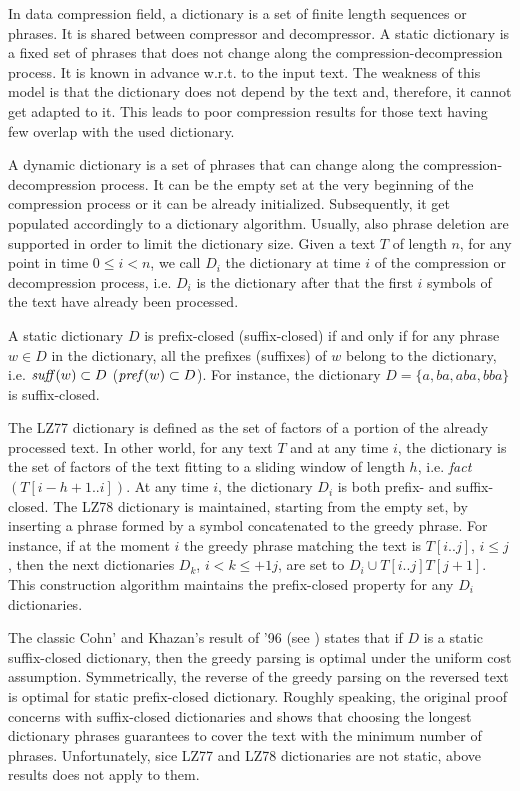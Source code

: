 \documentclass[12pt]{article}
\theoremstyle{plain}
\theoremstyle{definition}
\theoremstyle{remark}
\begin{document}
In data compression field, a dictionary is a set of finite length sequences or phrases. It is shared between compressor and decompressor. A static dictionary is a fixed set of phrases that does not change along the compression-decompression process. It is known in advance w.r.t. to the input text. The weakness of this model is that the dictionary does not depend by the text and, therefore, it cannot get adapted to it. This leads to poor compression results for those text having few overlap with the used dictionary.

A dynamic dictionary is a set of phrases that can change along the compression-decompression process. It can be the empty set at the very beginning of the compression process or it can be already initialized. Subsequently, it get populated accordingly to a dictionary algorithm. Usually, also phrase deletion are supported in order to limit the dictionary size. Given a text $T$ of length $n$, for any point in time $0 \leq i < n$, we call $D_i$ the dictionary 
at time $i$ of the compression or decompression process, i.e. $D_i$ is the dictionary after that the first $i$ symbols of the text have already been processed.

A static dictionary $D$ is prefix-closed (suffix-closed) if and only if for any phrase $w\in D$ in the dictionary, all the prefixes (suffixes) of $w$ belong to the dictionary, i.e. $\mbox{\emph{suff}}(w)\subset D$ ($\mbox{\emph{pref}}(w)\subset D$).  
For instance, the dictionary $D=\{a, ba, aba, bba\}$ is suffix-closed.

The LZ77 dictionary is defined as the set of factors of a portion of the already processed text. In other world, for any text $T$ and at any time $i$, the dictionary is the set of factors of the text fitting to a sliding window of length $h$, i.e.  \emph{fact}$(T[i-h+1..i])$. At any time $i$, the dictionary $D_i$ is both prefix- and suffix-closed. 
The LZ78 dictionary is maintained, starting from the empty set, by inserting a phrase formed by a symbol concatenated to the greedy phrase. For instance, if at the moment $i$ the greedy phrase matching the text is $T[i..j]$, $i \leq j$, then the next dictionaries $D_{k}$, $i < k \leq +1j$, are set to $D_{i} \cup T[i..j]T[j+1]$. This construction algorithm maintains the prefix-closed property for any $D_i$ dictionaries.

The classic Cohn' and Khazan's result of '96 (see \cite{DBLP:conf/dcc/CohnK96}) states that if $D$ is a static suffix-closed dictionary, then the greedy parsing is optimal under the uniform cost assumption. 
Symmetrically, the reverse of the greedy parsing on the reversed text is optimal for static prefix-closed dictionary. Roughly speaking, the original proof concerns with suffix-closed dictionaries and shows that choosing the longest dictionary phrases guarantees to cover the text with the minimum number of phrases. 
Unfortunately, sice LZ77 and LZ78 dictionaries are not static, above results does not apply to them. 
\end{document}
